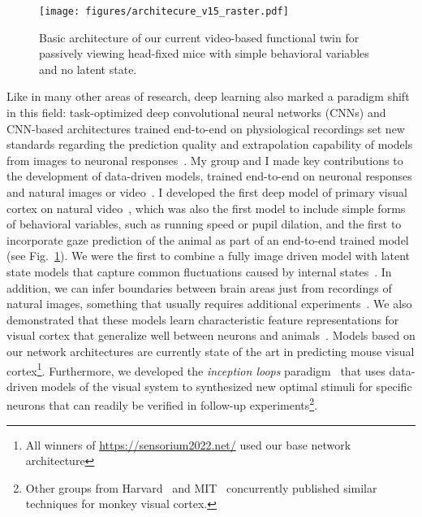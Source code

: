 \documentclass[B2,COG]{ercgrant}
\begin{document}
\begin{figure}
\vspace{-4ex}
\texttt{[image: figures/architecure\_v15\_raster.pdf]}
\caption{Basic architecture of our current video-based functional twin for passively viewing head-fixed mice with simple behavioral variables and no latent state.}
\label{fig:videomodel}
\end{figure}
Like in many other areas of research, deep learning also marked a paradigm shift in this field: task-optimized deep convolutional neural networks (CNNs) \parencite{Yamins2014-cg,Cadieu2014-gc,Cadena2017-rb} and CNN-based architectures trained end-to-end on physiological recordings set new standards regarding the prediction quality and extrapolation capability of models from images to neuronal responses~\parencite{Antolik2016-va,Batty2016-do,McIntosh2016-tr,Klindt2017-sb,Kindel2017-xs,Cadena2017-rb,Burg2021-yg, Lurz2020-ua, Bashiri2021-or,Zhang2018-cs,Cowley2020-cy,Ecker2018-gz, Sinz2018-sk, Walker2019-yw, Franke2022-do}. 
My group and I made key contributions to the development of data-driven models, trained end-to-end on neuronal responses and natural images or video~\parencite{Sinz2018-sk, Walker2019-yw, Lurz2020-ua, Bashiri2021-or, Lurz2022-up, Franke2022-do, Cobos2022-rr, Ecker2018-gz,Cadena2019-jw}. 
I developed the first deep model of primary visual cortex on natural video~\parencite{Sinz2018-sk}, which was also the first model to include simple forms of behavioral variables, such as running speed or pupil dilation, and the first to incorporate gaze prediction of the animal as part of an end-to-end trained model (see Fig.~\ref{fig:videomodel}). 
We were the first to combine a fully image driven model with latent state models that capture common fluctuations caused by internal states~\parencite{Bashiri2021-or}.
In addition, we can infer boundaries between brain areas just from recordings of natural images, something that usually requires additional experiments~\parencite{Bashiri2021-or}.
We also demonstrated that these models learn characteristic feature representations for visual cortex that generalize well between neurons and animals~\parencite{Lurz2020-ua,Cobos2022-rr}.
Models based on our network architectures are currently state of the art in predicting mouse visual cortex\footnote{All winners of  \url{https://sensorium2022.net/} used our base network architecture}. 
Furthermore, we developed the \textit{inception loops} paradigm~\parencite{Walker2019-yw} that uses data-driven models of the visual system to synthesized new optimal stimuli for specific neurons that can readily be verified in follow-up experiments\footnote{Other groups from Harvard~\parencite{Ponce2019-yn} and MIT~\parencite{Bashivan2019-ry} concurrently published similar techniques for monkey visual cortex.}. 
\end{document}
